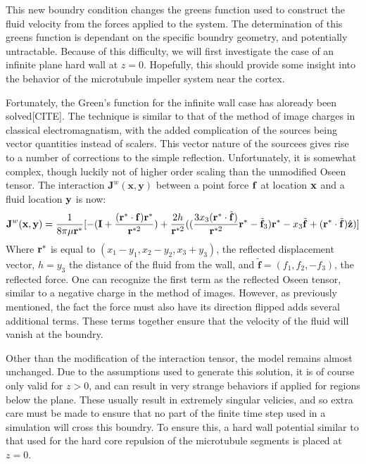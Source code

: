 \documentclass[11pt]{ucthesis}
\def\br{{\bf r}}
\begin{document}
{This new boundry condition changes the greens function used to construct the fluid velocity from the forces applied to the system. The determination of this greens function is dependant on the specific boundry geometry, and potentially untractable.
Because of this difficulty, we will first investigate the case of an infinite plane hard wall at $z=0$. Hopefully, this should provide some insight into the behavior of the microtubule impeller system near the cortex.

Fortunately, the Green's function for the infinite wall case has aloready been solved[CITE]. The technique is  similar to that of the method of image charges in classical electromagnatism, with the added complication of the sources being vector quantities instead of scalers. This vector nature of the sourcees gives rise to a number of corrections to the simple reflection.
Unfortunately, it is somewhat complex, though luckily not of higher order scaling than the unmodified Oseen tensor. The interaction $\mathbf{J}^w(\mathbf{x},\mathbf{y})$ between a point force $\bf f$ at location $\bf x$ and a fluid location $\bf y$ is now:
\begin{equation}
\label{eq:oseenwall}
\mathbf{J}^w(\mathbf{x}, \mathbf{y}) = \frac{1}{8\pi\mu \br^*} [ 
- (\mathbf{I} + \frac{(\br^*\cdot\mathbf{f})\br^*}{\br^{*2}}) 
+ \frac{2 h}{\br^{*2}}( (\frac{3 x_3(\br^*\cdot\tilde{\mathbf{f}})}{\br^{*2}} \br^* - \tilde{\mathbf{f}}_3)\br^* - x_3\tilde{\mathbf{f}} + (\br^*\cdot\tilde{\mathbf{f}})\hat{\mathbf{z}})]
\end{equation}
Where $\br^*$ is equal to $(x_1-y_1,x_2-y_2,x_3+y_3)$, the reflected displacement vector, $h = y_3$ the distance of the fluid from the wall, and $\tilde{\mathbf{f}} = (f_1,f_2,-f_3)$, the reflected force. 
One can recognize the first term as the reflected Oseen tensor, similar to a negative charge in the method of images. 
However, as previously mentioned, the fact the force must also have its direction flipped adds several additional terms. These terms together ensure that the velocity of the fluid will vanish at the boundry.

Other than the modification of the interaction tensor, the model remains almost unchanged.
Due to the assumptions used to generate this solution, it is of course only valid for $z>0$, and can result in very strange behaviors if applied for regions below the plane. 
These usually result in extremely singular velicies, and so extra care must be made to ensure that no part of the finite time step used in a simulation will cross this boundry. 
To ensure this, a hard wall potential similar to that used for the hard core repulsion of the microtubule segments is placed at $z=0$.

}
\end{document}
